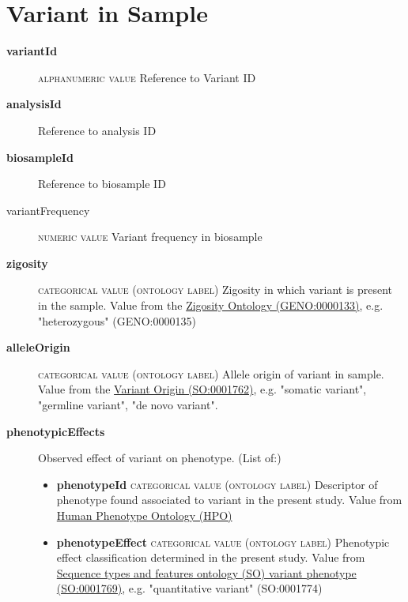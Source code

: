 \documentclass[a4paper, 10pt]{article}        %
\begin{document}
 
 
   \section*{ {\color{teal} Variant in Sample}}
  
  \begin{description}
  	\item[\textbf{variantId}]  {\textsc{alphanumeric value}} Reference to Variant ID 	
	\item[\textbf{analysisId}] Reference to analysis ID
	\item[\textbf{biosampleId}] Reference to biosample ID
	\item[variantFrequency] {\textsc{numeric value}} Variant frequency in biosample
	\item[\textbf{zigosity}] {\textsc{categorical value (ontology label)}} Zigosity in which variant is present in the sample. Value from the \href{https://github.com/monarch-initiative/GENO-ontology/}{Zigosity Ontology (GENO:0000133)}, e.g. "heterozygous" (GENO:0000135)
	\item[\textbf{alleleOrigin}] {\textsc{categorical value (ontology label)}} Allele origin of variant in sample. Value from the \href{http://purl.obolibrary.org/obo/SO_0001762}{Variant Origin (SO:0001762)}, e.g. "somatic variant", "germline variant", "de novo variant". %
	\item[\textbf{phenotypicEffects}] Observed effect of variant on phenotype. (List of:)
	\begin{itemize}
				\item[] \textbf{phenotypeId} {\textsc{categorical value (ontology label)}} Descriptor of phenotype found associated to variant in the present study. Value from \href{http:purl.obolibrary.org/obo/HP_0000001}{Human Phenotype Ontology (HPO)}
				\item[] \textbf{phenotypeEffect} {\textsc{categorical value (ontology label)}} Phenotypic effect classification determined in the present study. Value from \href{http://purl/obolibrary.org/obo/SO_0001769}{Sequence types and features ontology (SO) variant phenotype (SO:0001769)}, e.g. "quantitative variant" (SO:0001774)

\end{itemize}
\end{description}
\end{document}
